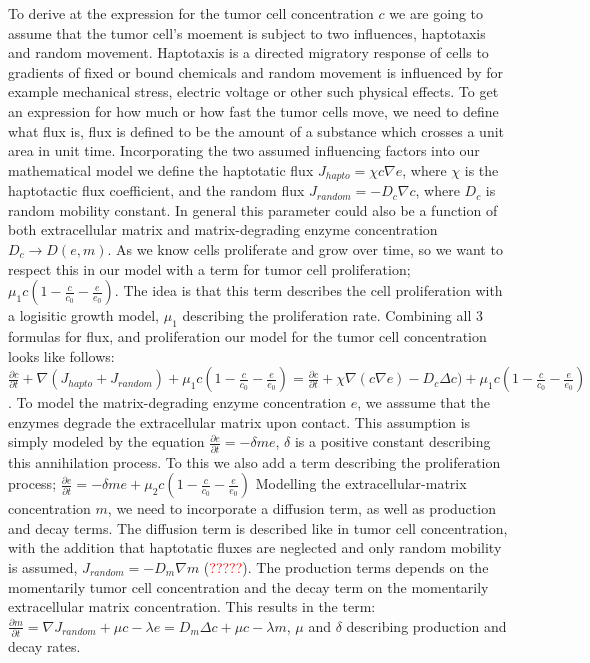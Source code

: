 To derive at the expression for the tumor cell concentration $c$ we are going to assume that the tumor cell's moement is subject to two influences, haptotaxis and random movement. Haptotaxis is a directed migratory response of cells to gradients of fixed or bound chemicals \cite{anderson_continuous_1998} and random movement is influenced by for example mechanical stress, electric voltage or other such physical effects. To get an expression for how much or how fast the tumor cells move, we need to define what flux is, flux is defined to be the amount of a substance  which crosses a unit area in unit time. Incorporating the two assumed influencing factors into our mathematical model we define the haptotatic flux $J_{hapto} = \chi c \nabla e$, where $\chi$ is the haptotactic flux coefficient, and the random flux $J_{random} = -D_c \nabla c$, where $D_c$ is random mobility constant. In general this parameter could also be a function of both extracellular matrix and matrix-degrading enzyme concentration $D_c \rightarrow D(e,m)$. As we know cells proliferate and grow over time, so we want to respect this in our model with a term for tumor cell proliferation; $\mu_1 c (1-\frac{c}{c_0} - \frac{e}{e_0})$. The idea is that this term describes the cell proliferation with a logisitic growth model, $\mu_1$ describing the proliferation rate.
Combining all 3 formulas for flux, and proliferation our model for the tumor cell concentration looks like follows: $\frac{\partial c}{\partial t} + \nabla (J_{hapto} + J_{random}) + \mu_1 c (1-\frac{c}{c_0} - \frac{e}{e_0}) = \frac{\partial c}{\partial t} + \chi \nabla (c \nabla e) - D_c \Delta c) + \mu_1 c (1-\frac{c}{c_0} - \frac{e}{e_0})$.\newline 
To model the matrix-degrading enzyme concentration $e$, we asssume that the enzymes degrade the extracellular matrix upon contact. This assumption is simply modeled by the equation $\frac{\partial e}{\partial t} = -\delta m e$, $\delta$ is a positive constant describing this annihilation process. To this we also add a term describing the proliferation process; $\frac{\partial e}{\partial t} = -\delta m e + \mu_2 c (1 - \frac{c}{c_0} - \frac{e}{e_0})$\newline 
Modelling the extracellular-matrix concentration $m$, we need to incorporate a diffusion term, as well as production and decay terms. The diffusion term is described like in tumor cell concentration, with the addition that haptotatic fluxes are neglected and only random mobility is assumed, $J_{random} = -D_m \nabla m$ (\textcolor{red}{?????}). The production terms depends on the momentarily tumor cell concentration and the decay term on the momentarily extracellular matrix concentration. This results in the term: $\frac{\partial m}{\partial t} = \nabla J_{random} + \mu c - \lambda e = D_m \Delta c + \mu c - \lambda m$, $\mu$ and $\delta$ describing production and decay rates.

